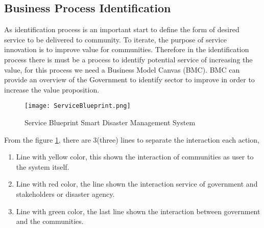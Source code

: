\subsection{Business Process Identification}
As identification process is an important start to define the form of desired service to be delivered to community. To iterate, the purpose of service innovation is to improve value for communities. Therefore in the identification process there is must be a process to identify potential service of increasing the value, for this process we need a Business Model Canvas (BMC)\cite{SOASImple}. BMC can provide an overview of the Government to identify sector to improve in order to increase the value proposition.\par

\begin{landscape}
\thispagestyle{empty}
\begin{figure}[H]
\centering
\texttt{[image: ServiceBlueprint.png]}
\caption{Service Blueprint Smart Disaster Management System}
\label{fig:ServiceBlueprint}
\end{figure}
\end{landscape}\par

From the figure \ref{fig:ServiceBlueprint}, there are 3(three) lines to separate the interaction each action,
\begin{enumerate}
\setlength{\itemsep}{1.5pt}
\setlength{\parskip}{1.5pt}
\item Line with yellow color, this shown the interaction of communities as user to the system itself. 
\item Line with red color, the line shown the interaction service of government and stakeholders or disaster agency.
\item Line with green color, the last line shown the interaction between  government and the communities.
\end{enumerate}

